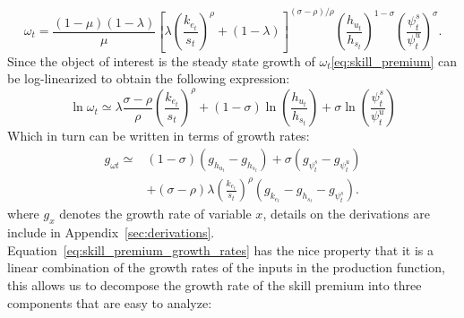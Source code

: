 \documentclass[12pt]{article}
\begin{document}
\begin{equation}\label{eq:skill_premium}
  \omega_{t}=\frac{(1-\mu)(1-\lambda)}{\mu}\left[\lambda\left(\frac{k_{e_t}}{s_{t}}\right)^{\rho}+(1-\lambda)\right]^{(\sigma-\rho) / \rho}\left(\frac{h_{u_t}}{h_{s_t}}\right)^{1-\sigma}\left(\frac{\psi^s_t}{\psi^u_t}\right)^{\sigma} .
\end{equation}
Since the object of interest is the steady state growth of $\omega_t$\eqref{eq:skill_premium} can be log-linearized to  obtain the following expression:
\begin{equation}\label{eq:skill_premium_log_linear}
  \ln \omega_{t} \simeq \lambda \frac{\sigma-\rho}{\rho}\left(\frac{k_{e_t}}{s_{t}}\right)^{\rho}+(1-\sigma) \ln \left(\frac{h_{u_t}}{h_{s_t}}\right)+\sigma \ln \left(\frac{\psi^s_t}{\psi^u_t}\right)
\end{equation}
Which in turn can be written in terms of growth rates:
\begin{equation}\label{eq:skill_premium_growth_rates}
  \begin{aligned}
    g_{\omega t} \simeq &(1-\sigma)\left(g_{h_{u_t}}-g_{h_{s_t}}\right)+\sigma\left(g_{\psi^s_t}-g_{\psi^u_t}\right) \\
    &+(\sigma-\rho) \lambda\left(\frac{k_{e_t}}{s_{t}}\right)^{\rho}\left(g_{k_{e_t}}-g_{h_{s_t}}-g_{\psi^s_t}\right) .
    \end{aligned}
\end{equation}
where $g_x$ denotes the growth rate of variable $x$, details on the derivations are include in Appendix~\ref{sec:derivations}. Equation~\eqref{eq:skill_premium_growth_rates} has the nice property that it is a linear combination of the growth rates of the inputs in the production function, this allows us to decompose the growth rate of the skill premium into three components that are easy to analyze:
\end{document}

